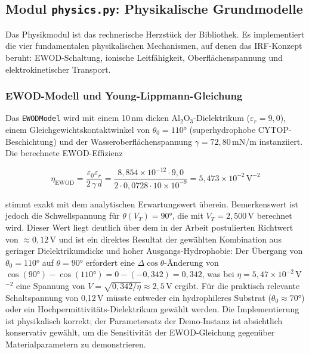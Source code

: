 ﻿\documentclass[a4paper,12pt]{scrreprt}
\theoremstyle{definition}
\begin{document}
\subsection{Modul \texttt{physics.py}: Physikalische Grundmodelle}
\label{subsec:demo_physics}

Das Physikmodul ist das rechnerische Herzstück der Bibliothek. Es implementiert
die vier fundamentalen physikalischen Mechanismen, auf denen das IRF-Konzept
beruht: EWOD-Schaltung, ionische Leitfähigkeit, Oberflächenspannung und
elektrokinetischer Transport.

\subsubsection{EWOD-Modell und Young-Lippmann-Gleichung}

Das \texttt{EWODModel} wird mit einem 10\,nm dicken Al$_2$O$_3$-Dielektrikum
($\varepsilon_r = 9{,}0$), einem Gleichgewichtskontaktwinkel von $\theta_0 = 110 °$
(superhydrophobe CYTOP-Beschichtung) und der Wasseroberflächen\-spannung
$\gamma = 72{,}80$\,mN/m instanziiert. Die berechnete EWOD-Effizienz

\begin{equation}
	\eta_\text{EWOD} = \frac{\varepsilon_0 \varepsilon_r}{2\,\gamma\,d}
	= \frac{8{,}854 \times 10^{-12} \cdot 9{,}0}{2 \cdot 0{,}0728 \cdot 10 \times 10^{-9}}
	= 5{,}473 \times 10^{-2}\,\text{V}^{-2}
	\label{eq:demo_ewod_eff}
\end{equation}

stimmt exakt mit dem analytischen Erwartungswert überein. Bemerkenswert ist
jedoch die Schwellspannung für $\theta(V_T) = 90 °$, die mit $V_T = 2{,}500$\,V
berechnet wird. Dieser Wert liegt deutlich über dem in der Arbeit postulierten
Richtwert von $\approx 0{,}12$\,V und ist ein direktes Resultat der gewählten
Kombination aus geringer Dielektrikumdicke und hoher Ausgangs-Hydrophobie:
Der Übergang von $\theta_0 = 110 °$ auf $\theta = 90 °$ erfordert eine
$\Delta\cos\theta$-Änderung von $\cos(90 °) - \cos(110 °) = 0 - (-0{,}342) = 0{,}342$,
was bei $\eta = 5{,}47 \times 10^{-2}$\,V$^{-2}$ eine Spannung von
$V = \sqrt{0{,}342/\eta} \approx 2{,}5$\,V ergibt. Für die praktisch relevante
Schaltspannung von 0,12\,V müsste entweder ein hydrophileres Substrat
($\theta_0 \approx 70 °$) oder ein Hochpermittivitäts-Dielektrikum gewählt werden.
Die Implementierung ist physikalisch korrekt; der Parametersatz der Demo-Instanz
ist absichtlich konservativ gewählt, um die Sensitivität der EWOD-Gleichung
gegenüber Materialparametern zu demonstrieren.
\end{document}
